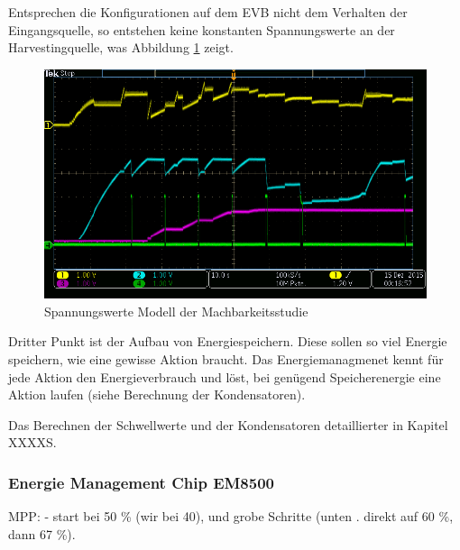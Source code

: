 Entsprechen die Konfigurationen auf dem EVB nicht dem Verhalten der Eingangsquelle, so entstehen keine konstanten Spannungswerte an der Harvestingquelle, was Abbildung \ref{falscheRegelung} zeigt.

\begin{figure}
    \includegraphics{2TheoretischeGrundlagen/imag/falscheRegelung.png}
    \caption{Spannungswerte Modell der Machbarkeitsstudie}\label{falscheRegelung} 
\end{figure}

Dritter Punkt ist der Aufbau von Energiespeichern. Diese sollen so viel Energie speichern, wie eine gewisse Aktion braucht. Das Energiemanagmenet kennt für jede Aktion den Energieverbrauch und löst, bei genügend Speicherenergie eine Aktion laufen (siehe Berechnung der Kondensatoren).

Das Berechnen der Schwellwerte und der Kondensatoren detaillierter in Kapitel XXXXS.






\subsubsection{Energie Management Chip EM8500}\label{t_em8500} 

MPP:
- start bei 50 \% (wir bei 40), und grobe Schritte (unten . direkt auf 60 \%, dann 67 \%). 





